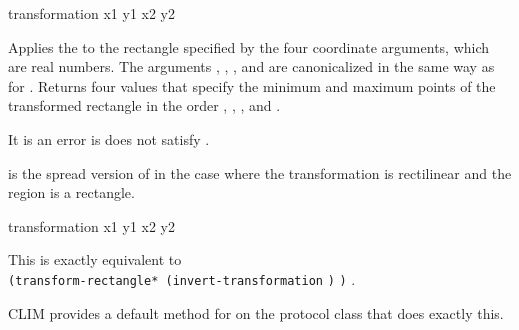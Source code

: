  {transformation x1 y1 x2 y2}

Applies the   to the rectangle
specified by the four coordinate arguments, which are real numbers.  The
arguments , , , and  are canonicalized in the
same way as for .  Returns four values that specify
the minimum and maximum points of the transformed rectangle in the order
, , , and .

It is an error is  does not satisfy
.

 is the spread version of  in the
case where the transformation is rectilinear and the region is a rectangle.

 {transformation x1 y1 x2 y2}

This is exactly equivalent to \\
\verb+(transform-rectangle* (invert-transformation+ \verb+)+
   \verb+)+ .

CLIM provides a default method for  on the
 protocol class that does exactly this.
